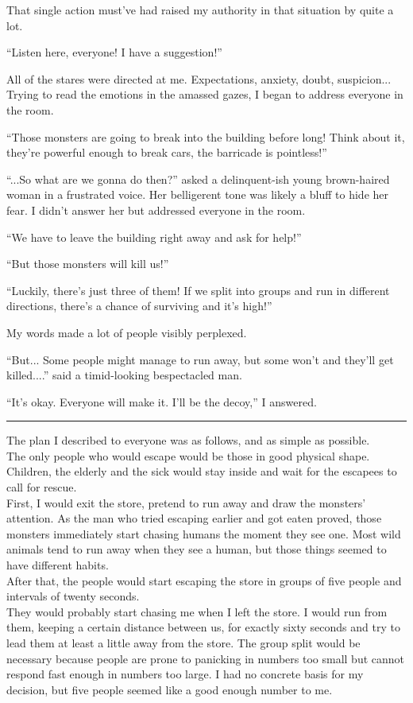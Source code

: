 That single action must've had raised my authority in that situation by quite a lot.

``Listen here, everyone! I have a suggestion!''

All of the stares were directed at me. Expectations, anxiety, doubt, suspicion... Trying to read the emotions in the amassed gazes, I began to address everyone in the room.

``Those monsters are going to break into the building before long! Think about it, they're powerful enough to break cars, the barricade is pointless!''

``...So what are we gonna do then?'' asked a delinquent-ish young brown-haired woman in a frustrated voice. Her belligerent tone was likely a bluff to hide her fear. I didn't answer her but addressed everyone in the room.

``We have to leave the building right away and ask for help!''

``But those monsters will kill us!''

``Luckily, there's just three of them! If we split into groups and run in different directions, there's a chance of surviving and it's high!''

My words made a lot of people visibly perplexed.

``But... Some people might manage to run away, but some won't and they'll get killed....'' said a timid-looking bespectacled man.

``It's okay. Everyone will make it. I'll be the decoy,'' I answered.

\vspace{\baselineskip}
\hrule
\vspace{\baselineskip}

The plan I described to everyone was as follows, and as simple as possible.\\
The only people who would escape would be those in good physical shape. Children, the elderly and the sick would stay inside and wait for the escapees to call for rescue.\\
First, I would exit the store, pretend to run away and draw the monsters' attention. As the man who tried escaping earlier and got eaten proved, those monsters immediately start chasing humans the moment they see one. Most wild animals tend to run away when they see a human, but those things seemed to have different habits.\\
After that, the people would start escaping the store in groups of five people and intervals of twenty seconds.\\
They would probably start chasing me when I left the store. I would run from them, keeping a certain distance between us, for exactly sixty seconds and try to lead them at least a little away from the store. The group split would be necessary because people are prone to panicking in numbers too small but cannot respond fast enough in numbers too large. I had no concrete basis for my decision, but five people seemed like a good enough number to me.

